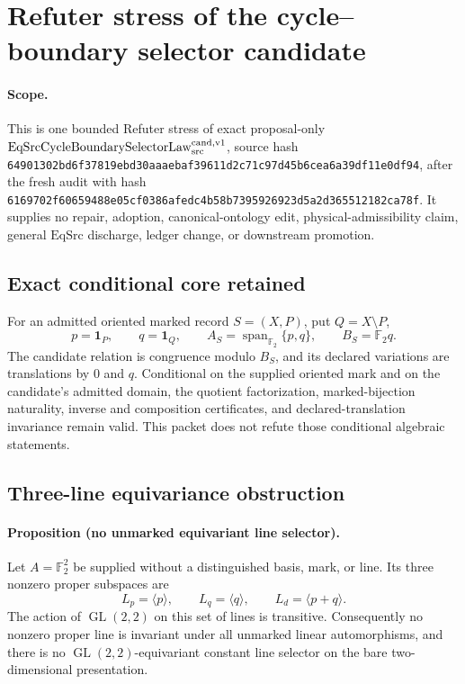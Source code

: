 \section{Refuter stress of the cycle--boundary selector candidate}

\paragraph{Scope.}
This is one bounded Refuter stress of exact proposal-only
\(\mathrm{EqSrcCycleBoundarySelectorLaw}_{\rm src}^{\rm cand,v1}\), source
hash
\texttt{64901302bd6f37819ebd30aaaebaf39611d2c71c97d45b6cea6a39df11e0df94},
after the fresh audit with hash
\texttt{6169702f60659488e05cf0386afedc4b58b7395926923d5a2d365512182ca78f}.
It supplies no repair, adoption, canonical-ontology edit,
physical-admissibility claim, general \(\mathrm{EqSrc}\) discharge, ledger
change, or downstream promotion.

\subsection{Exact conditional core retained}

For an admitted oriented marked record \(S=(X,P)\), put \(Q=X\setminus P\),
\[
 p=\mathbf1_P,\qquad q=\mathbf1_Q,\qquad
 A_S=\operatorname{span}_{\mathbb F_2}\{p,q\},\qquad
 B_S=\mathbb F_2q.
\]
The candidate relation is congruence modulo \(B_S\), and its declared
variations are translations by \(0\) and \(q\).  Conditional on the supplied
oriented mark and on the candidate's admitted domain, the quotient
factorization, marked-bijection naturality, inverse and composition
certificates, and declared-translation invariance remain valid.  This packet
does not refute those conditional algebraic statements.

\subsection{Three-line equivariance obstruction}

\paragraph{Proposition (no unmarked equivariant line selector).}
Let \(A=\mathbb F_2^2\) be supplied without a distinguished basis, mark, or
line.  Its three nonzero proper subspaces are
\[
 L_p=\langle p\rangle,\qquad L_q=\langle q\rangle,\qquad
 L_d=\langle p+q\rangle .
\]
The action of \(\operatorname{GL}(2,2)\) on this set of lines is transitive.
Consequently no nonzero proper line is invariant under all unmarked linear
automorphisms, and there is no \(\operatorname{GL}(2,2)\)-equivariant
constant line selector on the bare two-dimensional presentation.

